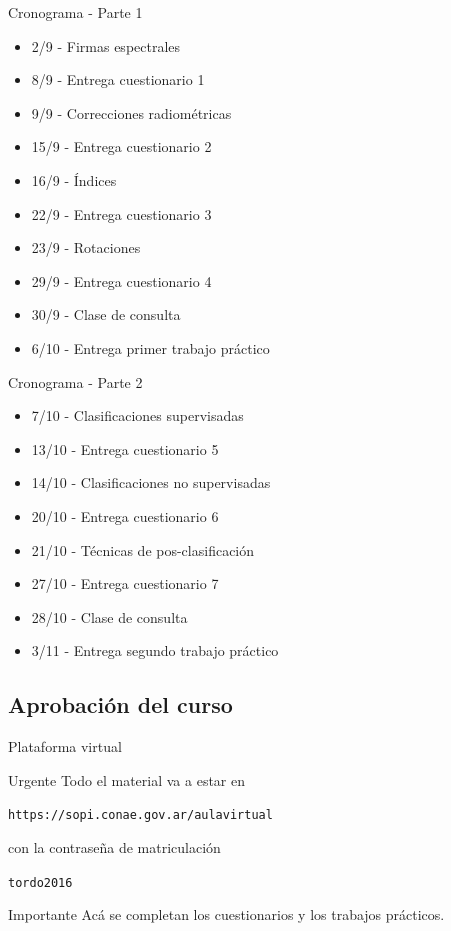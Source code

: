 \documentclass[]{article}
\begin{document}
\begin{frame}{Cronograma - Parte 1}
    \begin{itemize}[<+->]
    \item 2/9 - Firmas espectrales
    \item 8/9 - Entrega cuestionario 1
    \item 9/9 - Correcciones radiométricas
    \item 15/9 - Entrega cuestionario 2
    \item 16/9 - Índices
    \item 22/9 - Entrega cuestionario 3
    \item 23/9 - Rotaciones
    \item 29/9 - Entrega cuestionario 4
    \item 30/9 - Clase de consulta
    \item 6/10 - Entrega primer trabajo práctico
  \end{itemize}
\end{frame}
\begin{frame}{Cronograma - Parte 2}
    \begin{itemize}[<+->]
    \item 7/10 - Clasificaciones supervisadas
    \item 13/10 - Entrega cuestionario 5
    \item 14/10 - Clasificaciones no supervisadas
    \item 20/10 - Entrega cuestionario 6
    \item 21/10 - Técnicas de pos-clasificación
    \item 27/10 - Entrega cuestionario 7
    \item 28/10 - Clase de consulta
    \item 3/11 - Entrega segundo trabajo práctico
  \end{itemize}
\end{frame}

\subsection{Aprobación del curso}
\begin{frame}{Plataforma virtual}
  \begin{block}{Urgente}
    Todo el material va a estar en
    \begin{center}
      \texttt{https://sopi.conae.gov.ar/aulavirtual}\pause
    \end{center}
    con la contraseña de matriculación
    \begin{center}
      \texttt{tordo2016}
    \end{center}
  \end{block}\pause
  \begin{alertblock}{Importante}
    Acá se completan los cuestionarios y los trabajos prácticos.
  \end{alertblock}
\end{frame}
\end{document}
